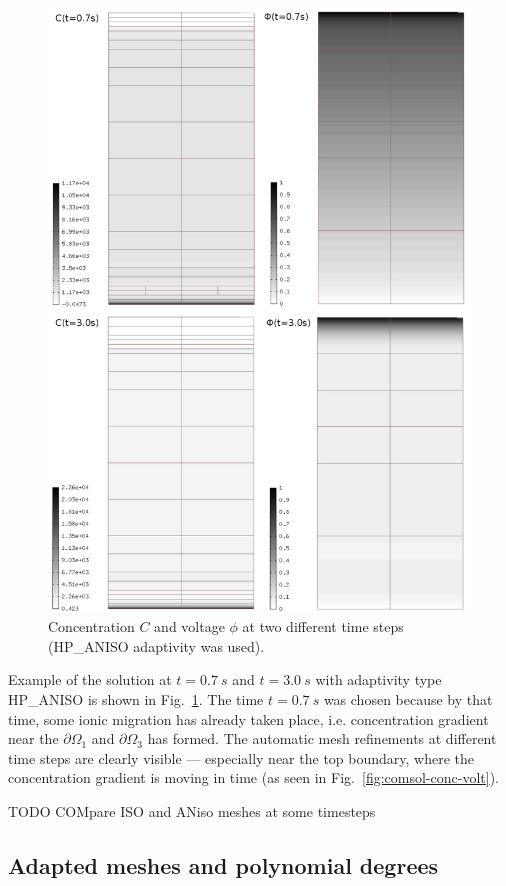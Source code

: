 \begin{figure}
  \begin{centering}
  \includegraphics[width=.75\columnwidth]{cphi}
  \caption{\label{fig:cphi} Concentration $C$
  and voltage $\phi$ at two different time steps
  (HP\_ANISO adaptivity was used).}
  \end{centering}
\end{figure}
Example of the solution at $t=0.7\ s$ and $t=3.0\ s$ 
with adaptivity type HP\_ANISO is shown
in Fig.~\ref{fig:cphi}. The time $t=0.7\ s$ was chosen because
by that time, some ionic migration has already taken place, i.e.
concentration gradient near the $\partial\Omega_1$ and
$\partial\Omega_3$ has formed. The automatic mesh refinements
at different time steps are clearly visible --- especially
near the top boundary, where the concentration gradient is
moving in time (as seen in Fig.~\ref{fig:comsol-conc-volt}).


TODO COMpare ISO and ANiso meshes at some timesteps


\subsection{Adapted meshes and polynomial degrees}

